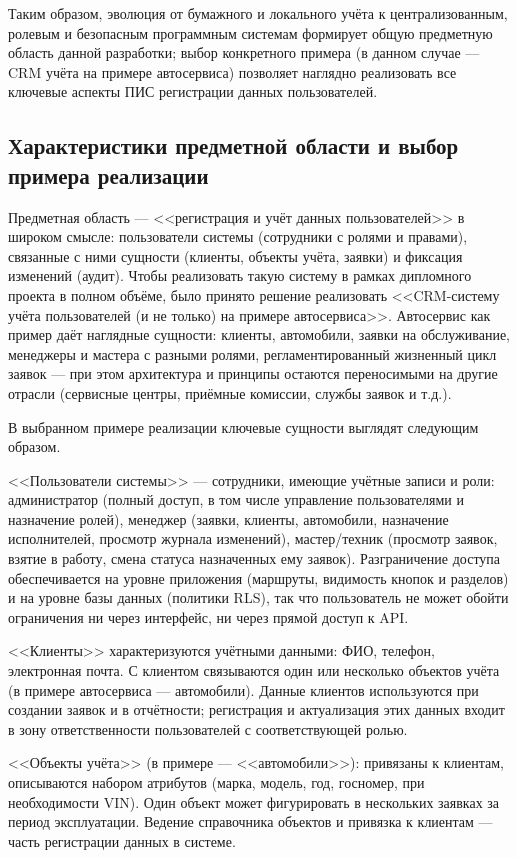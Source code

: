 Таким образом, эволюция от бумажного и локального учёта к централизованным, ролевым и безопасным программным системам формирует общую предметную область данной разработки; выбор конкретного примера (в данном случае — CRM учёта на примере автосервиса) позволяет наглядно реализовать все ключевые аспекты ПИС регистрации данных пользователей.

\subsection{Характеристики предметной области и выбор примера реализации}

Предметная область — <<регистрация и учёт данных пользователей>> в широком смысле: пользователи системы (сотрудники с ролями и правами), связанные с ними сущности (клиенты, объекты учёта, заявки) и фиксация изменений (аудит). Чтобы реализовать такую систему в рамках дипломного проекта в полном объёме, было принято решение реализовать <<CRM-систему учёта пользователей (и не только) на примере автосервиса>>. Автосервис как пример даёт наглядные сущности: клиенты, автомобили, заявки на обслуживание, менеджеры и мастера с разными ролями, регламентированный жизненный цикл заявок — при этом архитектура и принципы остаются переносимыми на другие отрасли (сервисные центры, приёмные комиссии, службы заявок и т.д.).

В выбранном примере реализации ключевые сущности выглядят следующим образом.

<<Пользователи системы>> — сотрудники, имеющие учётные записи и роли: администратор (полный доступ, в том числе управление пользователями и назначение ролей), менеджер (заявки, клиенты, автомобили, назначение исполнителей, просмотр журнала изменений), мастер/техник (просмотр заявок, взятие в работу, смена статуса назначенных ему заявок). Разграничение доступа обеспечивается на уровне приложения (маршруты, видимость кнопок и разделов) и на уровне базы данных (политики RLS), так что пользователь не может обойти ограничения ни через интерфейс, ни через прямой доступ к API.

<<Клиенты>>  характеризуются учётными данными: ФИО, телефон, электронная почта. С клиентом связываются один или несколько объектов учёта (в примере автосервиса — автомобили). Данные клиентов используются при создании заявок и в отчётности; регистрация и актуализация этих данных входит в зону ответственности пользователей с соответствующей ролью.

<<Объекты учёта>> (в примере — <<автомобили>>): привязаны к клиентам, описываются набором атрибутов (марка, модель, год, госномер, при необходимости VIN). Один объект может фигурировать в нескольких заявках за период эксплуатации. Ведение справочника объектов и привязка к клиентам — часть регистрации данных в системе.

